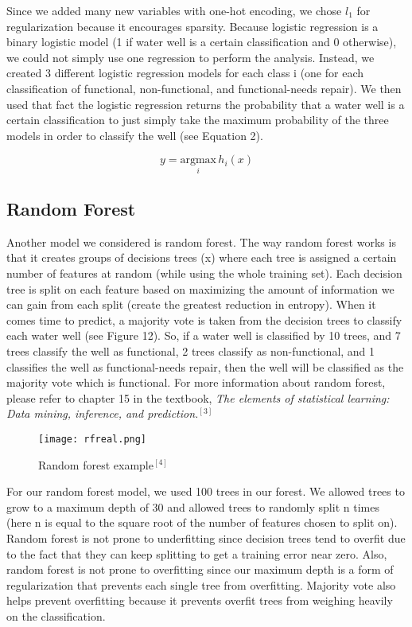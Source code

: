 \documentclass[10pt]{SelfArx} %
\begin{document}
Since we added many new variables with one-hot encoding, we chose $l_1$ for regularization because it encourages sparsity. Because logistic regression is a binary logistic model (1 if water well is a certain classification and 0 otherwise), we could not simply use one regression to perform the analysis. Instead, we created 3 different logistic regression models for each class i (one for each classification of functional, non-functional, and functional-needs repair). We then used that fact the logistic regression returns the probability that a water well is a certain classification to just simply take the maximum probability of the three models in order to classify the well (see Equation 2).

\begin{equation}
 y= \underset{i}{\mathrm{argmax}}\, h_i(x) 
\end{equation}

\subsection{Random Forest}

Another model we considered is random forest. The way random forest works is that it creates groups of decisions trees (x) where each tree is assigned a certain number of features at random (while using the whole training set). Each decision tree is split on each feature based on maximizing the amount of information we can gain from each split (create the greatest reduction in entropy). When it comes time to predict, a majority vote is taken from the decision trees to classify each water well (see Figure 12). So, if a water well is classified by 10 trees, and 7 trees classify the well as functional, 2 trees classify as non-functional, and 1 classifies the well as functional-needs repair, then the well will be classified as the majority vote which is functional. For more information about random forest, please refer to chapter 15 in the textbook,\textit{ The elements of statistical learning: Data mining, inference, and prediction.}$^{[3]}$
\break

\begin{figure}\centering
\captionsetup{skip=0.5cm}
\texttt{[image: rfreal.png]}
\caption{Random forest example$^{[4]}$}
\label{fig:rf}
\end{figure}

For our random forest model, we used 100 trees in our forest. We allowed trees to grow to a maximum depth of 30 and allowed trees to randomly split n times (here n is equal to the square root of the number of features chosen to split on). Random forest is not prone to underfitting since decision trees tend to overfit due to the fact that they can keep splitting to get a training error near zero. Also, random forest is not prone to overfitting since our maximum depth is a form of regularization that prevents each single tree from overfitting. Majority vote also helps prevent overfitting because it prevents overfit trees from weighing heavily on the classification.
\end{document}
